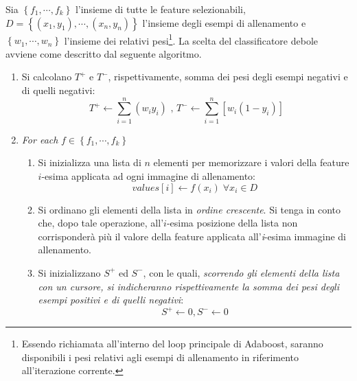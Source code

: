             Sia $\left\{f_1,\cdots,f_k\right\}$ l'insieme di tutte le feature selezionabili, $D = \left\{(x_1,y_1), \cdots, (x_n, y_n) \right\}$ l'insieme degli esempi di allenamento e $\left\{w_1, \cdots, w_n\right\}$ l'insieme dei relativi pesi\footnote{Essendo richiamata all'interno del loop principale di Adaboost, saranno disponibili i pesi relativi agli esempi di allenamento in riferimento all'iterazione corrente.}. 
            La scelta del classificatore debole avviene come descritto dal seguente algoritmo.

            \begin{enumerate}
                \item Si calcolano $T^+$ e $T^-$, rispettivamente, somma dei pesi degli esempi negativi e di quelli negativi:
                \begin{equation}
                    \label{subeq:weight_total_sums}
                    T^+ \leftarrow \sum_{i = 1}^{n} (w_i y_i)
                    \text{ , }
                    T^- \leftarrow \sum_{i = 1}^{n} \left[w_i (1 - y_i)\right]
                \end{equation}

                \item \emph{For each} $f \in \left\{f_1, \cdots, f_k\right\}$

                \begin{enumerate}
                    \item Si inizializza una lista di $n$ elementi per memorizzare i valori della feature $i$-esima applicata ad ogni immagine di allenamento:
                    \begin{equation}
                        \label{subeq:element_list_initialization}
                        values[i] \leftarrow f(x_i) \; \forall x_i \in D
                    \end{equation}

                    \item Si ordinano gli elementi della lista in \emph{ordine crescente}. 
                    Si tenga in conto che, dopo tale operazione, all'$i$-esima posizione della lista non corrisponderà più il valore della feature applicata all'\emph{i}-esima immagine di allenamento.

                    \item Si inizializzano $S^+$ ed $S^-$, con le quali, \emph{scorrendo gli elementi della lista con un cursore, si indicheranno rispettivamente la somma dei pesi degli esempi positivi e di quelli negativi}:
                    \begin{equation}
                        \label{subeq:partial_sum_initialization}
                        S^+ \leftarrow 0, S^- \leftarrow 0
                    \end{equation}


\end{enumerate}
\end{enumerate}
